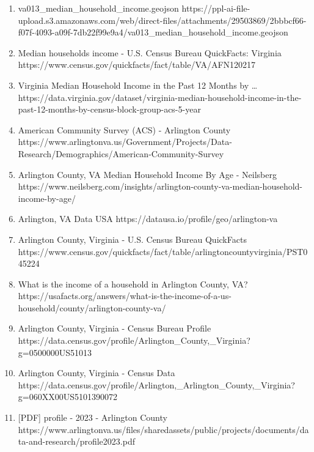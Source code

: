 \documentclass[
  letterpaper,
  DIV=11,
  numbers=noendperiod]{scrartcl}
\begin{document}
\begin{enumerate}
\item
  va013\_median\_household\_income.geojson
  https://ppl-ai-file-upload.s3.amazonaws.com/web/direct-files/attachments/29503869/2bbbcf66-f07f-4093-a09f-7db22f99e9a4/va013\_median\_household\_income.geojson
\item
  Median households income - U.S. Census Bureau QuickFacts: Virginia
  https://www.census.gov/quickfacts/fact/table/VA/AFN120217
\item
  Virginia Median Household Income in the Past 12 Months by \ldots{}
  https://data.virginia.gov/dataset/virginia-median-household-income-in-the-past-12-months-by-census-block-group-acs-5-year
\item
  American Community Survey (ACS) - Arlington County
  https://www.arlingtonva.us/Government/Projects/Data-Research/Demographics/American-Community-Survey
\item
  Arlington County, VA Median Household Income By Age - Neilsberg
  https://www.neilsberg.com/insights/arlington-county-va-median-household-income-by-age/
\item
  Arlington, VA \textbar{} Data USA
  https://datausa.io/profile/geo/arlington-va
\item
  Arlington County, Virginia - U.S. Census Bureau QuickFacts
  https://www.census.gov/quickfacts/fact/table/arlingtoncountyvirginia/PST045224
\item
  What is the income of a household in Arlington County, VA?
  https://usafacts.org/answers/what-is-the-income-of-a-us-household/county/arlington-county-va/
\item
  Arlington County, Virginia - Census Bureau Profile
  https://data.census.gov/profile/Arlington\_County,\_Virginia?g=0500000US51013
\item
  Arlington County, Virginia - Census Data
  https://data.census.gov/profile/Arlington,\_Arlington\_County,\_Virginia?g=060XX00US5101390072
\item
  {[}PDF{]} profile - 2023 - Arlington County
  https://www.arlingtonva.us/files/sharedassets/public/projects/documents/data-and-research/profile2023.pdf
\end{enumerate}
\end{document}
